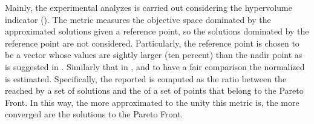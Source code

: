 %
%
%
%
%
%
%


Mainly, the experimental analyzes is carried out considering the hypervolume indicator (\HV{}).
%
The \HV{} metric measures the objective space dominated by the approximated solutions given a reference point, so the solutions dominated by the reference point are not considered.
%
Particularly, the reference point is chosen to be a vector whose values are sightly larger (ten percent) than the nadir point as is suggested in \cite{ishibuchi2017reference}.
%
Similarly that in \cite{li2015evolutionary}, and to have a fair comparison the normalized \HV{} is estimated.
%
Specifically, the \HV{} reported is computed as the ratio between the \HV{} reached by a set of solutions and the \HV{} of a set of points that belong to the Pareto Front.
%
In this way, the more approximated to the unity this metric is, the more converged are the solutions to the Pareto Front.
%



